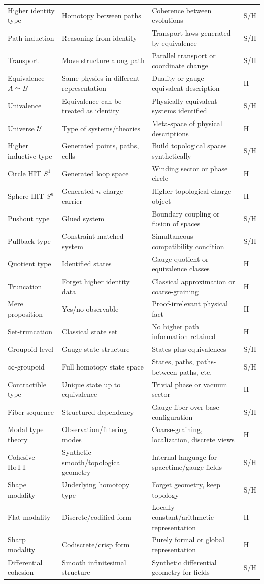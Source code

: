 \documentclass[11pt]{article}
\newcommand{\status}[1]{\textsf{#1}}
\newcommand{\entry}[4]{#1 & #2 & #3 & \status{#4}\\}
\begin{document}
\begin{longtable}{@{}>{\raggedright\arraybackslash}p{}>{\raggedright\arraybackslash}p{}>{\raggedright\arraybackslash}p{}>{\centering\arraybackslash}p{}@{}}
\entry{Higher identity type}{Homotopy between paths}{Coherence between evolutions}{S/H}
\entry{Path induction}{Reasoning from identity}{Transport laws generated by equivalence}{S/H}
\entry{Transport}{Move structure along path}{Parallel transport or coordinate change}{S/H}
\entry{Equivalence $A\simeq B$}{Same physics in different representation}{Duality or gauge-equivalent description}{H}
\entry{Univalence}{Equivalence can be treated as identity}{Physically equivalent systems identified}{S/H}
\entry{Universe $\mathcal U$}{Type of systems/theories}{Meta-space of physical descriptions}{H}
\entry{Higher inductive type}{Generated points, paths, cells}{Build topological spaces synthetically}{S/H}
\entry{Circle HIT $S^1$}{Generated loop space}{Winding sector or phase circle}{H}
\entry{Sphere HIT $S^n$}{Generated $n$-charge carrier}{Higher topological charge object}{H}
\entry{Pushout type}{Glued system}{Boundary coupling or fusion of spaces}{S/H}
\entry{Pullback type}{Constraint-matched system}{Simultaneous compatibility condition}{S/H}
\entry{Quotient type}{Identified states}{Gauge quotient or equivalence classes}{H}
\entry{Truncation}{Forget higher identity data}{Classical approximation or coarse-graining}{H}
\entry{Mere proposition}{Yes/no observable}{Proof-irrelevant physical fact}{H}
\entry{Set-truncation}{Classical state set}{No higher path information retained}{H}
\entry{Groupoid level}{Gauge-state structure}{States plus equivalences}{S/H}
\entry{$\infty$-groupoid}{Full homotopy state space}{States, paths, paths-between-paths, etc.}{S/H}
\entry{Contractible type}{Unique state up to equivalence}{Trivial phase or vacuum sector}{H}
\entry{Fiber sequence}{Structured dependency}{Gauge fiber over base configuration}{S/H}
\entry{Modal type theory}{Observation/filtering modes}{Coarse-graining, localization, discrete views}{H}
\entry{Cohesive HoTT}{Synthetic smooth/topological geometry}{Internal language for spacetime/gauge fields}{S/H}
\entry{Shape modality}{Underlying homotopy type}{Forget geometry, keep topology}{S/H}
\entry{Flat modality}{Discrete/codified form}{Locally constant/arithmetic representation}{H}
\entry{Sharp modality}{Codiscrete/crisp form}{Purely formal or global representation}{H}
\entry{Differential cohesion}{Smooth infinitesimal structure}{Synthetic differential geometry for fields}{S/H}
\end{longtable}
\end{document}
